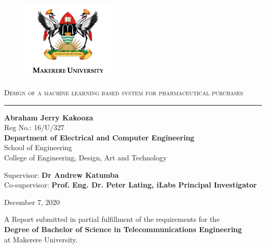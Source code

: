 \documentclass[12pt]{report}
\begin{document}
\begin{titlepage}
\centering

\begin{figure}[H]
\centering
\includegraphics[width=0.4\textwidth]{MAK_Logo2_png.png}%
\end{figure}


\textsc{}


{\huge \textsc{Design of a machine learning based system for pharmaceutical purchases}  \\}
\rule{3in}{0.4pt}


{\Large\textbf{Abraham Jerry Kakooza}	 \\}
Reg No.: 16/U/327\\ \vspace{2cm}
{\large \textbf{Department of Electrical and Computer Engineering} \\
School of Engineering \\
College of Engineering, Design, Art and Technology}




{
Supervisor: \textbf{Dr Andrew Katumba}    \\
Co-supervisor: \textbf{Prof. Eng. Dr. Peter Lating, iLabs Principal Investigator} }


December 7, 2020


{
A Report submitted in partial fulfillment of the requirements for the \\ \textbf{ Degree of Bachelor of Science in Telecommunications Engineering} \\ at Makerere University. }


\end{titlepage}
\end{document}

